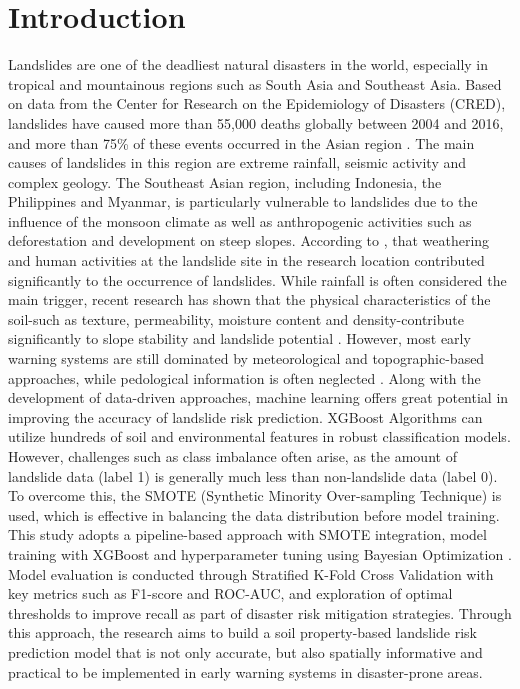 \section{Introduction}
Landslides are one of the deadliest natural disasters in the world, especially in tropical and mountainous regions such as South Asia and Southeast Asia. Based on data from the Center for Research on the Epidemiology of Disasters (CRED), landslides have caused more than 55,000 deaths globally between 2004 and 2016, and more than 75\% of these events occurred in the Asian region \cite{b1}. The main causes of landslides in this region are extreme rainfall, seismic activity and complex geology.
The Southeast Asian region, including Indonesia, the Philippines and Myanmar, is particularly vulnerable to landslides due to the influence of the monsoon climate as well as anthropogenic activities such as deforestation and development on steep slopes. According to \cite{b2},  that weathering and human activities at the landslide site in the research location contributed significantly to the occurrence of landslides.
While rainfall is often considered the main trigger, recent research has shown that the physical characteristics of the soil-such as texture, permeability, moisture content and density-contribute significantly to slope stability and landslide potential \cite{b3}. However, most early warning systems are still dominated by meteorological and topographic-based approaches, while pedological information is often neglected \cite{b4}.
Along with the development of data-driven approaches, machine learning offers great potential in improving the accuracy of landslide risk prediction. XGBoost Algorithms can utilize hundreds of soil and environmental features in robust classification models. However, challenges such as class imbalance often arise, as the amount of landslide data (label 1) is generally much less than non-landslide data (label 0). To overcome this, the SMOTE (Synthetic Minority Over-sampling Technique) is used, which is effective in balancing the data distribution before model training.
This study adopts a pipeline-based approach with SMOTE integration, model training with XGBoost and hyperparameter tuning using Bayesian Optimization \cite{b5}. Model evaluation is conducted through Stratified K-Fold Cross Validation with key metrics such as F1-score and ROC-AUC, and exploration of optimal thresholds to improve recall as part of disaster risk mitigation strategies.
Through this approach, the research aims to build a soil property-based landslide risk prediction model that is not only accurate, but also spatially informative and practical to be implemented in early warning systems in disaster-prone areas.